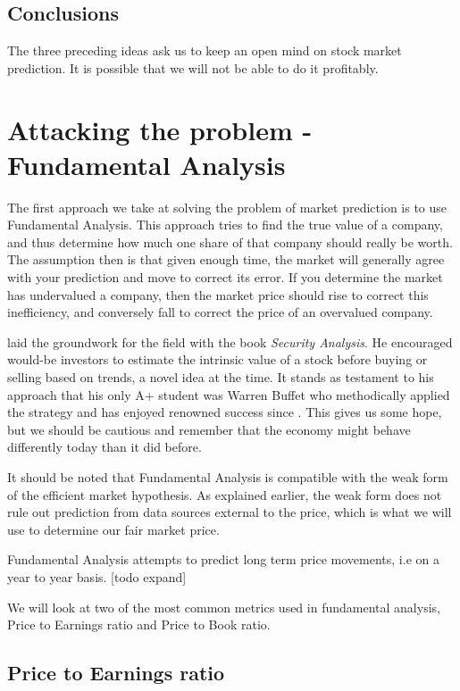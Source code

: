 \documentclass{report}
\begin{document}
\section{Conclusions}

The three preceding ideas ask us to keep an open mind on stock market prediction. It is possible that we will not be able to do it profitably.

\chapter{Attacking the problem - Fundamental Analysis}

The first approach we take at solving the problem of market prediction is to use Fundamental Analysis. This approach tries to find the true value of a company, and thus determine how much one share of that company should really be worth. The assumption then is that given enough time, the market will generally agree with your prediction and move to correct its error. If you determine the market has undervalued a company, then the market price should rise to correct this inefficiency, and conversely fall to correct the price of an overvalued company. 

\citet{graham1934security} laid the groundwork for the field with the book \textit{Security Analysis}. He encouraged would-be investors to estimate the intrinsic value of a stock before buying or selling based on trends, a novel idea at the time. It stands as testament to his approach that his only A+ student was Warren Buffet who methodically applied the strategy and has enjoyed renowned success since \cite{schroeder2008snowball}. This gives us some hope, but we should be cautious and remember that the economy might behave differently today than it did before.

It should be noted that Fundamental Analysis is compatible with the weak form of the efficient market hypothesis. As explained earlier, the weak form does not rule out prediction from data sources external to the price, which is what we will use to determine our fair market price.

Fundamental Analysis attempts to predict long term price movements, i.e on a year to year basis. [todo expand]

We will look at two of the most common metrics used in fundamental analysis, Price to Earnings ratio and Price to Book ratio.

\section{Price to Earnings ratio}
\end{document}
